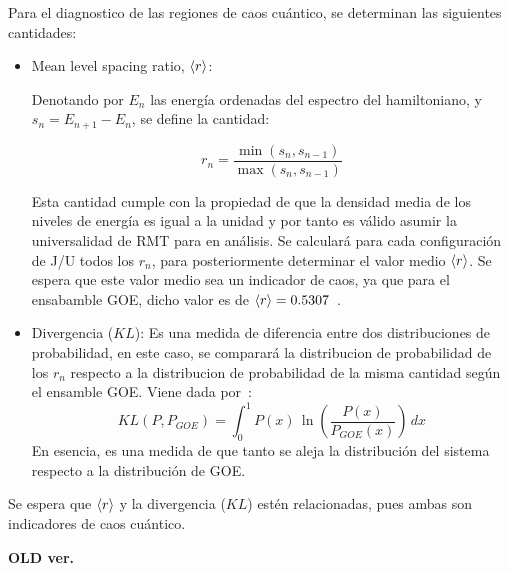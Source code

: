 \documentclass[spanish,titlepage,table]{practicas}
\begin{document}
Para el diagnostico de las regiones de caos cuántico, se determinan las siguientes cantidades:
\begin{itemize}
    \item Mean level spacing ratio, $\ev{r}$:

Denotando por $E_n$ las energía ordenadas del espectro del hamiltoniano, y
    $s_n=E_{n+1}-E_{n}$, se define la cantidad:

		\begin{equation}
			r_n=\frac{\min(s_n,s_{n-1})}{\max(s_n,s_{n-1})}
		\end{equation}

    Esta cantidad cumple con la propiedad de que la densidad media de los niveles de energía es igual a la unidad
    y por tanto es válido asumir la universalidad de RMT para en análisis.
    Se calculará para cada configuración de J/U todos los $r_n$, para posteriormente determinar el valor medio $\ev{r}$.
    Se espera que este valor medio sea un indicador de caos, ya que para el ensabamble GOE, dicho valor es de $\ev{r}=0.5307$~\cite{Atas_2013}.
    \item Divergencia ($KL$): Es una medida de diferencia entre dos distribuciones de probabilidad, en este caso, se comparará la distribucion de probabilidad de los $r_n$ 
    respecto a la distribucion de probabilidad de la misma cantidad según el ensamble GOE. Viene dada por~\cite{Pausch2022}:
    \begin{equation}
KL(P,P_{GOE}) = \int_{0}^{1} P(x) \, \ln \left( \frac{P(x)}{P_{GOE}(x)} \right) \, dx
    \end{equation}
    En esencia, es una medida de que tanto se aleja la distribución del sistema respecto a la distribución de GOE.   
\end{itemize}
Se espera que $\ev{r}$ y la divergencia ($KL$) estén relacionadas, pues ambas son indicadores de caos cuántico. 



\textbf{OLD ver.}


\end{document}
